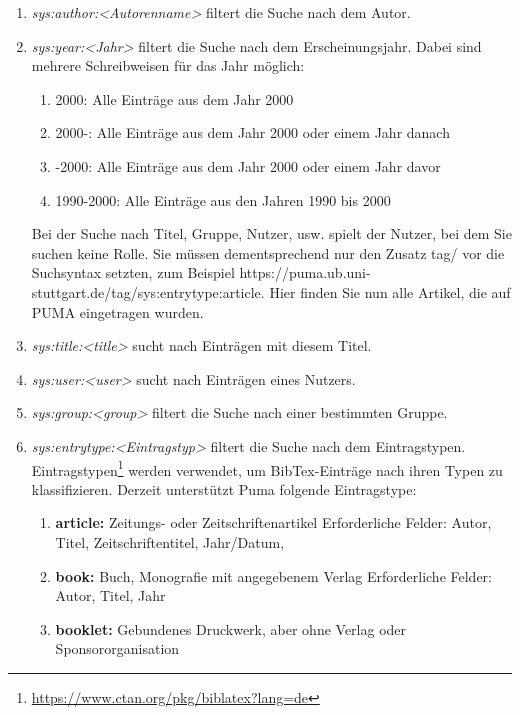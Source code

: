 \begin{enumerate}
    \item \textit{sys:author:<Autorenname>} filtert die Suche nach dem Autor.
    \item \textit{sys:year:<Jahr>} filtert die Suche nach dem Erscheinungsjahr. Dabei sind mehrere Schreibweisen für das Jahr möglich:
    \begin{enumerate}
        \item 2000: Alle Einträge aus dem Jahr 2000
        \item 2000-: Alle Einträge aus dem Jahr 2000 oder einem Jahr danach
        \item -2000: Alle Einträge aus dem Jahr 2000 oder einem Jahr davor
        \item 1990-2000: Alle Einträge aus den Jahren 1990 bis 2000
    \end{enumerate}
Bei der Suche nach Titel, Gruppe, Nutzer, usw. spielt der Nutzer, bei dem Sie suchen keine Rolle. Sie müssen dementsprechend nur den Zusatz tag/ vor die Suchsyntax setzten, zum Beispiel  https://puma.ub.uni-stuttgart.de/tag/sys:entrytype:article. Hier finden Sie nun alle Artikel, die auf PUMA eingetragen wurden.
    \item \textit{sys:title:<title>} sucht nach Einträgen mit diesem Titel.
    \item \textit{sys:user:<user>} sucht nach Einträgen eines Nutzers.
    \item \textit{sys:group:<group>} filtert die Suche nach einer bestimmten Gruppe.
    \item \textit{sys:entrytype:<Eintragstyp>} filtert die Suche nach dem Eintragstypen. Eintragstypen\footnote{\url{https://www.ctan.org/pkg/biblatex?lang=de}} werden verwendet, um BibTex-Einträge nach ihren Typen zu klassifizieren. Derzeit unterstützt Puma folgende Eintragstype:
    \begin{enumerate}
        \item \textbf{article:} Zeitungs- oder Zeitschriftenartikel\newline
        Erforderliche Felder: Autor, Titel, Zeitschriftentitel, Jahr/Datum, %
        \item \textbf{book:} Buch, Monografie mit angegebenem Verlag\newline
        Erforderliche Felder: Autor, Titel, Jahr
        \item \textbf{booklet:} Gebundenes Druckwerk, aber ohne Verlag oder Sponsororganisation\newline

\end{enumerate}
\end{enumerate}
